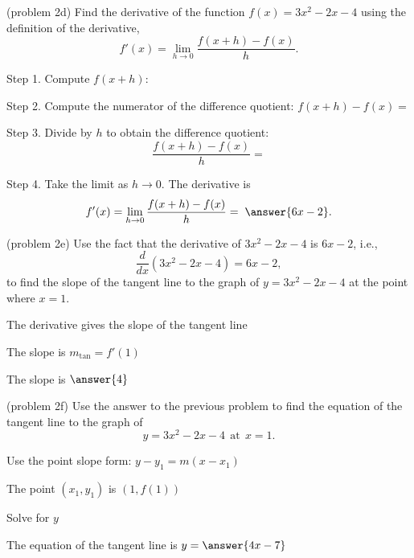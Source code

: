 \documentclass{ximera}
\begin{document}
\begin{problem}(problem 2d)
Find the derivative of the function $f(x) = 3x^2 - 2x -4$ using the definition of the derivative,
\[
f'(x) = \lim_{h \to 0} \frac{f(x+h) - f(x)}{h}.
\]

Step 1. Compute $f(x + h)$:
\begin{multipleChoice}
\end{multipleChoice}


Step 2. Compute the numerator of the difference quotient: $f(x+h) - f(x) =$
\begin{multipleChoice}
\end{multipleChoice}


Step 3. Divide by $h$ to obtain the difference quotient:
\[
\frac{f(x+h) - f(x)}{h} = 
\]
\begin{multipleChoice}
\end{multipleChoice}

Step 4. Take the limit as $h \to 0$. The derivative is
\[
f'(x) = \lim_{h \to 0} \frac{f(x+h) - f(x)}{h} = \; \answer{6x-2}.
\]
\end{problem} 


\begin{problem}(problem 2e)
Use the fact that the derivative of $3x^2 -2x - 4$ is $6x-2$,
i.e., 
\[
\frac{d}{dx}\left( 3x^2 - 2x -4  \right) = 6x-2,
\]
to find the slope of the tangent line to the graph of 
$y = 3x^2 - 2x - 4$ at the point where $x = 1$.\\
\begin{hint}
The derivative gives the slope of the tangent line
\end{hint}
\begin{hint}
The slope is $m_{\text{tan}} = f'(1)$
\end{hint}
The slope is $\answer{4}$
\end{problem}

\begin{problem}(problem 2f)
Use the answer to the previous problem to find the equation of the tangent line to the graph of 
\[
y = 3x^2 - 2x - 4 \ \ \text{at} \ \ x=1.
\]
\begin{hint}
Use the point slope form: $y-y_1 = m(x-x_1)$
\end{hint}
\begin{hint}
The point $(x_1,y_1)$ is $(1, f(1))$
\end{hint}
\begin{hint}
Solve for $y$
\end{hint}
The equation of the tangent line is \; $y = \answer{4x - 7}$
\end{problem}
\end{document}

